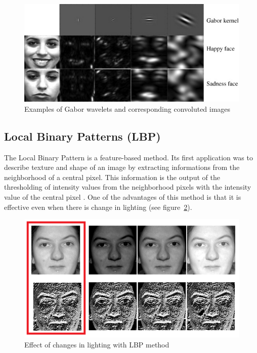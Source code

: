 \begin{figure}[!h]
\begin{center}
\noindent \includegraphics[scale=0.8]{figures/gabor_wavelets_example} 
\newline
\caption{Examples of Gabor wavelets and corresponding convoluted images}
\label{gabor_wavelets_example}
\end{center} 
\end{figure}

\subsection{Local Binary Patterns (LBP)}

\vspace{\baselineskip}
\noindent The Local Binary Pattern is a feature-based method. Its first application was to describe texture and shape of an image by extracting informations from the neighborhood of a central pixel. This information is the output of the thresholding of intensity values from the neighborhood pixels with the intensity value of the central pixel \cite{GAN08}. One of the advantages of this method is that it is effective even when there is change in lighting (see figure~\ref{lbp_change_lighting}).
\newline

\begin{figure}[!h]
\begin{center}
\noindent \includegraphics[scale=0.6]{figures/lbp_change_lighting} 
\newline
\caption{Effect of changes in lighting with LBP method}
\label{lbp_change_lighting}
\end{center} 
\end{figure}

